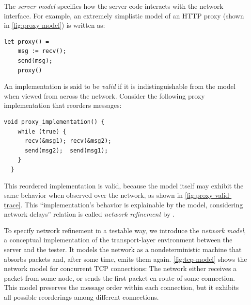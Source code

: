 
The {\em server model} specifies how the server code
interacts with the network interface.  For example, an extremely simplistic model of
an HTTP proxy
(shown in \autoref{fig:proxy-model}) is written as:

\begin{lstlisting}[style=customcoq]
let proxy() =
    msg := recv();
    send(msg);
    proxy()
\end{lstlisting}

An implementation is said to be {\em valid} if it is indistinguishable from
the model when viewed from across the network.  Consider
the following proxy implementation that reorders messages:

\begin{lstlisting}[style=customc]
  void proxy_implementation() {
    while (true) {
      recv(&msg1); recv(&msg2);
      send(msg2);  send(msg1);
    }
  }
\end{lstlisting}
This reordered implementation is valid, because the model itself may
exhibit the same behavior when observed over the network, as shown in
\autoref{fig:proxy-valid-trace}.  This ``implementation's behavior is
explainable by the model, considering network delays''
relation is called {\em network refinement} by
\textcite{cpp19}.

To specify network refinement in a testable way, we introduce
the {\em network model}, a conceptual implementation of the transport-layer
environment between the server and the tester.  It models the network as a
nondeterministic machine that absorbs packets and,  after some time, emits
them again.  \autoref{fig:tcp-model} shows the network model for concurrent TCP
connections: The network
either
receives a packet from some node, or sends the first packet en route of some
connection.  This model preserves the message order within each connection,
but it exhibits all possible reorderings among different connections.

